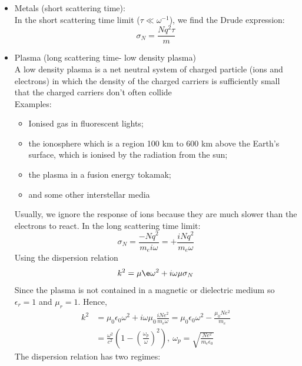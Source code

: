 \documentclass[a4paper, 11pt, normalem]{report}
\newcommand\eno{\epsilon_0}
\newcommand\er{\epsilon_r}
\begin{document}
\begin{itemize}
    \item Metals (short scattering time): \\
    In the short scattering time limit ($\tau \ll \omega^{-1}$), we find the Drude expression:
    \begin{equation}
        \sigma_N = \frac{Nq^2\tau}{m}
    \end{equation}
    \item Plasma (long scattering time- low density plasma) \\
        A low density plasma is a net neutral system of charged particle (ions and electrons) in which the density of the charged carriers is sufficiently small that the charged carriers don't often collide \\
        Examples:
        \begin{itemize}
            \item Ionised gas in fluorescent lights;
            \item the ionosphere which is a region 100 km to 600 km above the Earth's surface, which is ionised by the radiation from the sun;
            \item the plasma in a fusion energy tokamak;
            \item and some other interstellar media
        \end{itemize}
        Usually, we ignore the response of ions because they are much slower than the electrons to react. In the long scattering time limit:
        \begin{equation}
            \sigma_N = \frac{-Nq^2}{m_ei\omega} = +\frac{iNq^2}{m_e\omega}
        \end{equation}
        Using the dispersion relation
        \begin{equation}
            k^2 = \mu\e\omega^2 + i\omega\mu\sigma_N
        \end{equation}
        Since the plasma is not contained in a magnetic or dielectric medium so $\er = 1$ and $\mu_r = 1$. Hence,
        \begin{align}
            k^2 &= \mu_0\eno\omega^2 + i\omega\mu_0\frac{iNe^2}{m_e\omega} = \mu_0\eno\omega^2 - \frac{\mu_0Ne^2}{m_e} \\
                &= \frac{\omega^2}{c^2}\left(1 - \left(\frac{\omega_p}{\omega}\right)^2\right),~ \omega_p = \sqrt{\frac{Ne^2}{m_e\eno}}
        \end{align}
        The dispersion relation has two regimes:
        \begin{enumerate}

\end{enumerate}
\end{itemize}
\end{document}
